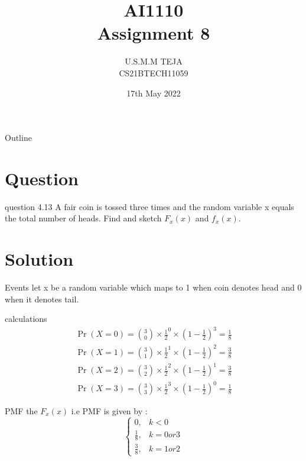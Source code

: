 \documentclass{beamer}
\title{AI1110 \\ Assignment 8}
\author{U.S.M.M TEJA \\ CS21BTECH11059}
\date{17th May 2022}
\providecommand{\pr}[1]{\ensuremath{\Pr\left(#1\right)}}
\begin{document}
	\begin{frame}
		\titlepage
	\end{frame}
	
	\begin{frame}{Outline}
    		\tableofcontents
	\end{frame}
	
	\section{Question}
	\begin{frame}{question 4.13}
A fair coin is tossed three times and the random variable x equals the total number of heads.
Find and sketch $F_x(x)$ and $f_x(x)$.
	\end{frame}
	
	\section{Solution}
	\begin{frame}{Events}
let x be a random variable which maps to 1 when coin denotes head and 0 when it denotes tail.

\begin{table}[ht!]
		\centering
		
		\caption{Events and Description}
		\label{table:1}
\end{table}
    \end{frame}

\begin{frame}{calculations}
 \begin{align}
     &\pr{X=0} = \binom{3}{0}\times \frac{1}{2}^0 \times (1-\frac{1}{2})^3 = \frac{1}{8}& \\
 &\pr{X=1} = \binom{3}{1}\times \frac{1}{2}^1 \times (1-\frac{1}{2})^2 = \frac{3}{8}& \\   
 &\pr{X=2} = \binom{3}{2}\times \frac{1}{2}^2 \times (1-\frac{1}{2})^1 = \frac{3}{8}& \\
 &\pr{X=3} = \binom{3}{3}\times \frac{1}{2}^3 \times (1-\frac{1}{2})^0 = \frac{1}{8}& 
\end{align}   
\end{frame}

\begin{frame}{PMF}
 the $F_x(x)$ i.e PMF is given by :
 \begin{equation}
 \begin{cases}
 0, & k < 0 \\
 \frac{1}{8}, & k = 0 or 3 \\
 \frac{3}{8}, & k = 1 or 2
 \end{cases}
 \label{cdf}
 \end{equation}
\end{frame}
\end{document}
